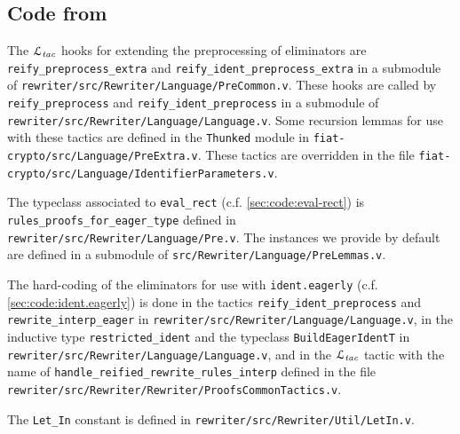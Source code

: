 \documentclass[a4paper,USenglish,cleveref,autoref,thm-restate]{lipics-v2021}
\newcommand{\Ltac}{\ensuremath{\mathcal{L}_\text{\emph{tac}}}}
\begin{document}
\begin{minipage}[t][1cm]{\textwidth}
\subsection{Code from }\label{sec:code-from-implementation-and-usage}

The \Ltac{} hooks for extending the preprocessing of eliminators are \texttt{reify_preprocess_extra} and \texttt{reify_ident_preprocess_extra} in a submodule of \texttt{rewriter/src/Rewriter/Language/PreCommon.v}.
These hooks are called by \texttt{reify_preprocess} and \texttt{reify_ident_preprocess} in a submodule of \texttt{rewriter/src/Rewriter/Language/Language.v}.
Some recursion lemmas for use with these tactics are defined in the \verb|Thunked| module in \texttt{fiat-crypto/src/Language/PreExtra.v}.
These tactics are overridden in the file \texttt{fiat-crypto/src/Language/IdentifierParameters.v}.

The typeclass associated to \texttt{eval_rect} ({c.f.} \autoref{sec:code:eval-rect}) is \texttt{rules_proofs_for_eager_type} defined in \texttt{rewriter/src/Rewriter/Language/Pre.v}.
The instances we provide by default are defined in a submodule of \texttt{src/Rewriter/Language/PreLemmas.v}.

The hard-coding of the eliminators for use with \texttt{ident.eagerly} ({c.f.} \autoref{sec:code:ident.eagerly}) is done in the tactics \texttt{reify_ident_preprocess} and \texttt{rewrite_interp_eager} in \texttt{rewriter/src/Rewriter/Language/Language.v}, in the inductive type \texttt{restricted_ident} and the typeclass \texttt{BuildEagerIdentT} in \texttt{rewriter/src/Rewriter/Language/Language.v}, and in the \Ltac{} tactic with the name of \texttt{handle_reified_rewrite_rules_interp} defined in the file \texttt{rewriter/src/Rewriter/Rewriter/ProofsCommonTactics.v}.

The \texttt{Let_In} constant is defined in \texttt{rewriter/src/Rewriter/Util/LetIn.v}.
\end{minipage}
\end{document}
